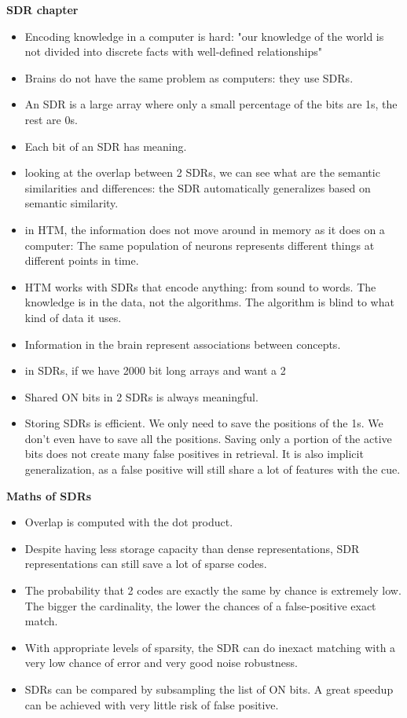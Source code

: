 \documentclass{article}
\begin{document}
\textbf{SDR chapter}
\begin{itemize}
\item Encoding knowledge in a computer is hard: "our knowledge of the world is not divided into discrete facts with well-defined relationships"
\item Brains do not have the same problem as computers: they use SDRs.
\item An SDR  is a large array where only a small percentage of the bits are 1s, the rest are 0s.
\item Each bit of an SDR has meaning.
\item looking at the overlap between 2 SDRs, we can see what are the semantic similarities and differences: the SDR automatically generalizes based on semantic similarity.
\item in HTM, the information does not move around in memory as it does on a computer: The same population of neurons represents different things at different points in time.
\item HTM works with SDRs that encode anything: from sound to words. The knowledge is in the data, not the algorithms. The algorithm is blind to what kind of data it uses.
\item Information in the brain represent associations between concepts.
\item in SDRs, if we have 2000 bit long arrays and want a 2%
\item Shared ON bits in 2 SDRs is always meaningful.
\item Storing SDRs is efficient. We only need to save the positions of the 1s. We don't even have to save all the positions. Saving only a portion of the active bits does not create many false positives in retrieval. It is also implicit generalization, as a false positive will still share a lot of features with the cue.
\end{itemize}


\textbf{Maths of SDRs}
\begin{itemize}
\item Overlap is computed with the dot product.
\item Despite having less storage capacity than dense representations, SDR representations can still save a lot of sparse codes.
\item The probability that 2 codes are exactly the same by chance is extremely low. The bigger the cardinality, the lower the chances of a false-positive exact match.
\item With appropriate levels of sparsity, the SDR can do inexact matching with a very low chance of error and very good noise robustness.
\item SDRs can be compared by subsampling the list of ON bits. A great speedup can be achieved with very little risk of false positive.
\end{itemize}
\end{document}
